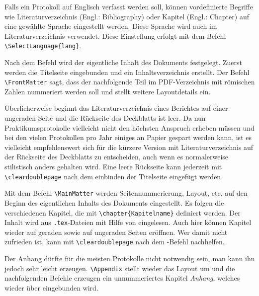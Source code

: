 Falls ein Protokoll auf Englisch verfasst werden soll, können vordefinierte Begriffe wie Literaturverzeichnis (Engl.: Bibliography) oder Kapitel (Engl.: Chapter) auf eine gewählte Sprache eingestellt werden. Diese Sprache wird auch im Literaturverzeichnis verwendet. Diese Einstellung erfolgt mit dem Befehl \verb|\SelectLanguage{lang}|.

Nach dem Befehl \verb|| wird der eigentliche Inhalt des Dokuments festgelegt. Zuerst werden die Titelseite eingebunden und ein Inhaltsverzeichnis erstellt. Der Befehl \verb|\FrontMatter| sagt, dass der nachfolgende Teil im PDF-Verzeichnis mit römischen Zahlen nummeriert werden soll und stellt weitere Layoutdetails ein.

Überlicherweise beginnt das Literaturverzeichnis eines Berichtes auf einer ungeraden Seite und die Rückseite des Deckblatts ist leer. Da nun Praktikumsprotokolle vielleicht nicht den höchsten Anspruch erheben müssen und bei den vielen Protokollen pro Jahr einiges an Papier gespart werden kann, ist es vielleicht empfehlenswert sich für die kürzere Version mit Literaturverzeichnis auf der Rückseite des Deckblatts zu entscheiden, auch wenn es normalerweise stilistisch anders gehalten wird. Eine leere Rückseite kann jederzeit mit \verb|\cleardoublepage| nach dem einbinden der Titelseite eingefügt werden.

Mit dem Befehl \verb|\MainMatter| werden Seitennummerierung, Layout, etc. auf den Beginn des eigentlichen Inhalts des Dokuments eingestellt. Es folgen die verschiedenen Kapitel, die mit \verb|\chapter{Kapitelname}| definiert werden. Der Inhalt wird aus \verb|.tex|-Dateien mit Hilfe von \verb|| eingelesen. Auch hier können Kapitel wieder auf geraden sowie auf ungeraden Seiten eröffnen. Wer damit nicht zufrieden ist, kann mit \verb|\cleardoublepage| nach dem \verb||-Befehl nachhelfen.

Der Anhang dürfte für die meisten Protokolle nicht notwendig sein, man kann ihn jedoch sehr leicht erzeugen. \verb|\Appendix| stellt wieder das Layout um und die nachfolgenden Befehle erzeugen ein unnummeriertes Kapitel \textit{Anhang}, welches wieder über \verb|| eingebunden wird.

